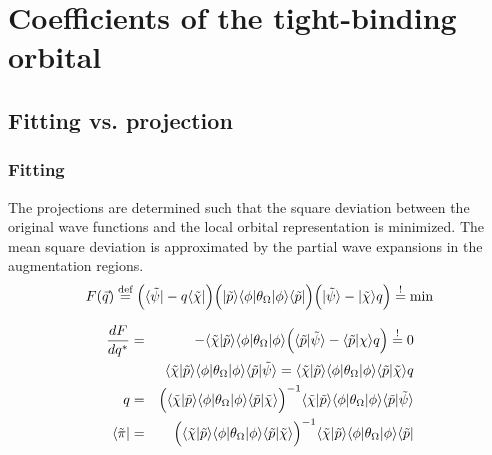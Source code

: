 \documentclass[11pt,a4paper]{report}
\begin{document}
\section{Coefficients of the tight-binding orbital}


\subsection{Fitting vs. projection}
\subsubsection{Fitting}
The projections are determined such that the square deviation between
the original wave functions and the local orbital representation is
minimized. The mean square deviation is approximated by the partial
wave expansions in the augmentation regions.
\begin{eqnarray}
F(\vec{q})\stackrel{\text{def}}{=} \Bigl(\langle\tilde{\psi}|-q\langle\tilde{\chi}|\Bigr)
\Bigl(|\tilde{p}\rangle\langle\phi|\theta_\Omega|\phi\rangle\langle\tilde{p}|\Bigr)
\Bigl(|\tilde{\psi}\rangle-|\tilde{\chi}\rangle q\Bigr)\stackrel{!}{=}\text{min}
\end{eqnarray}

\begin{eqnarray}
\frac{dF}{dq^*}&=&-\langle\tilde{\chi}|\tilde{p}\rangle
\langle\phi|\theta_\Omega|\phi\rangle
\Bigl(
\langle\tilde{p}|\tilde{\psi}\rangle-\langle\tilde{p}|\chi\rangle q\Bigr)
\stackrel{!}{=}0
\nonumber\\
%
%
%
&&\langle\tilde{\chi}|\tilde{p}\rangle
\langle\phi|\theta_\Omega|\phi\rangle
\langle\tilde{p}|\tilde{\psi}\rangle
=
\langle\tilde{\chi}|\tilde{p}\rangle
\langle\phi|\theta_\Omega|\phi\rangle
\langle\tilde{p}|\tilde\chi\rangle q
\nonumber\\
%
%
%
q&=&\Bigl(\langle\tilde{\chi}|\tilde{p}\rangle
\langle\phi|\theta_\Omega|\phi\rangle
\langle\tilde{p}|\tilde{\chi}\rangle\Bigr)^{-1}
\langle\tilde{\chi}|\tilde{p}\rangle
\langle\phi|\theta_\Omega|\phi\rangle
\langle\tilde{p}|\tilde{\psi}\rangle
\nonumber\\
%
%
%
\langle\tilde{\pi}|&=&
\Bigl(\langle\tilde{\chi}|\tilde{p}\rangle
\langle\phi|\theta_\Omega|\phi\rangle
\langle\tilde{p}|\tilde{\chi}\rangle\Bigr)^{-1}
\langle\tilde{\chi}|\tilde{p}\rangle
\langle\phi|\theta_\Omega|\phi\rangle
\langle\tilde{p}|
\label{eq:orbitalprojector}
\end{eqnarray}
\end{document}
